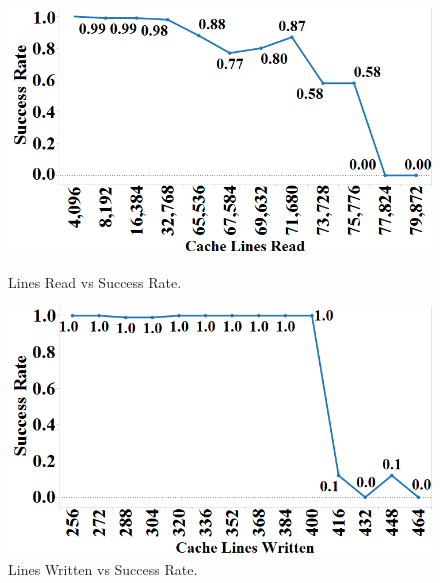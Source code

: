 \begin{figure}[h]%
\centering
\begin{minipage}[b]{.45\linewidth}
\centering
\includegraphics[width=\linewidth]{images/wttm_capacity_read_intel}
\vspace{-25pt}
\caption{Lines Read vs Success Rate.}
\label{fig:wttm_capacity_read_intel}
\end{minipage}%
\quad
\begin{minipage}[b]{.45\linewidth}
\centering
\includegraphics[width=\linewidth]{images/wttm_capacity_write_intel}
\vspace{-25pt}
\caption{Lines Written vs Success Rate.}
\label{fig:wttm_capacity_write_intel}
\end{minipage}
\end{figure}

